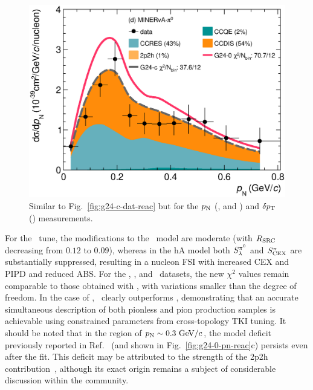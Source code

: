 \begin{figure}
        \includegraphics[width=\dbfigwid\textwidth]{figures/tuning/0026-min_pi0_pn_reac_decomp_covfix.eps}
        \caption{\label{fig:g24-c-pn-reac}  
        Similar to Fig.~\ref{fig:g24-c-dat-reac} but for the $p_\textrm{N}$ (\ttkpip, \minzpi and \minpiz) and $\delta p_\textrm{T}$ (\ttkzpi) measurements. 
        } 
    \end{figure}

    For the \gC\ tune, the modifications to the \sfcfg\ model are moderate (with $R_\textrm{SRC}$ decreasing from $0.12$ to $0.09$), whereas in the hA model both $S_\lambda^{\pi^{0}}$ and $S_\textrm{CEX}^{\pi}$ are substantially suppressed, resulting in a nucleon FSI with increased CEX and PIPD and reduced ABS.  
    For the \ttkzpi, \ttkpip, and \minzpi\ datasets, the new $\chi^2$ values remain comparable to those obtained with \gZero, with variations smaller than the degree of freedom. 
    In the case of \minpiz, \gC\ clearly outperforms \gZero, demonstrating that an accurate simultaneous description of both pionless and pion production samples is achievable using constrained parameters from cross-topology TKI tuning. 
    It should be noted that in the region of $p_\textrm{N}\sim0.3~\textrm{GeV}/c$, the model deficit previously reported in Ref.~\cite{MINERvA:2018hba} (and shown in Fig.~\ref{fig:g24-0-pn-reac}c) persists even after the fit. 
    This deficit may be attributed to the strength of the 2p2h contribution~\cite{MINERvA:2018hba}, although its exact origin remains a subject of considerable discussion within the community.

